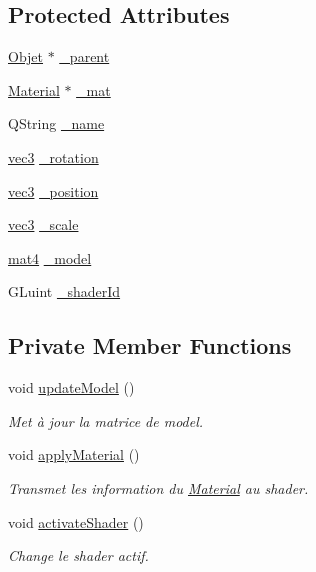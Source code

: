 \subsection*{Protected Attributes}
\begin{DoxyCompactItemize}
\item 
\hyperlink{class_objet}{Objet} $\ast$ \hyperlink{class_objet_a91c5a50011c3fe9233a645aa767a275f}{\+\_\+parent}
\item 
\hyperlink{class_material}{Material} $\ast$ \hyperlink{class_objet_aefea82be8c63504190ac63d5e44ff61a}{\+\_\+mat}
\item 
Q\+String \hyperlink{class_objet_ac19f568a794dd9387386ee71914a868e}{\+\_\+name}
\item 
\hyperlink{structvec3}{vec3} \hyperlink{class_objet_a1d8675e88cc98ba740292af1421c2ee1}{\+\_\+rotation}
\item 
\hyperlink{structvec3}{vec3} \hyperlink{class_objet_a6c1a10fa5f4c5cd0e0617d93f42d927b}{\+\_\+position}
\item 
\hyperlink{structvec3}{vec3} \hyperlink{class_objet_a3fee0c5016edddf7c4b9a0b55ef44752}{\+\_\+scale}
\item 
\hyperlink{structmat4}{mat4} \hyperlink{class_objet_a1963cca59f62c7a6f69a9c2c461ad9ea}{\+\_\+model}
\item 
G\+Luint \hyperlink{class_objet_af0d545a506dbfa377c8ca5a499fdf755}{\+\_\+shader\+Id}
\end{DoxyCompactItemize}
\subsection*{Private Member Functions}
\begin{DoxyCompactItemize}
\item 
void \hyperlink{class_objet_a0960722f5ddb16f2c245dca4e6584f25}{update\+Model} ()
\begin{DoxyCompactList}\small\item\em Met à jour la matrice de model. \end{DoxyCompactList}\item 
void \hyperlink{class_objet_a5c21e68142ae5b7c880cbd80336fb43e}{apply\+Material} ()
\begin{DoxyCompactList}\small\item\em Transmet les information du \hyperlink{class_material}{Material} au shader. \end{DoxyCompactList}\item 
void \hyperlink{class_objet_a995e953fb2f3d1a472aa04d2c5848f0a}{activate\+Shader} ()
\begin{DoxyCompactList}\small\item\em Change le shader actif. \end{DoxyCompactList}\end{DoxyCompactItemize}


